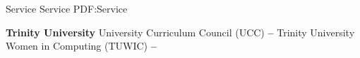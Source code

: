 \Section
{Service}
{Service}
{PDF:Service}

\Entry
\textbf{Trinity University}
\Gap
University Curriculum Council (UCC)
\dotfill
\textbf{ -- }
\Gap
Trinity University Women in Computing (TUWIC)
\dotfill
\textbf{ -- }